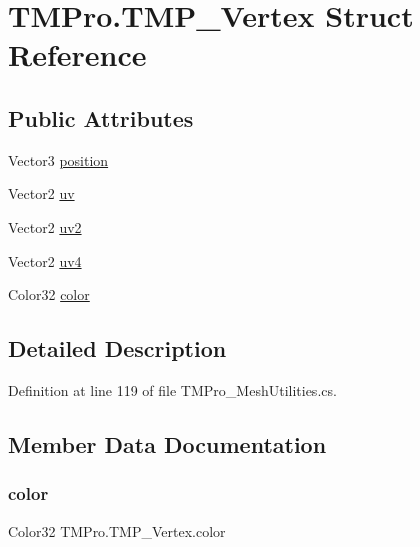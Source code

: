 \hypertarget{struct_t_m_pro_1_1_t_m_p___vertex}{}\section{T\+M\+Pro.\+T\+M\+P\+\_\+\+Vertex Struct Reference}
\label{struct_t_m_pro_1_1_t_m_p___vertex}
\subsection*{Public Attributes}
\begin{DoxyCompactItemize}
\item 
Vector3 \mbox{\hyperlink{struct_t_m_pro_1_1_t_m_p___vertex_a732a47e3a657ca52b92385e80b508884}{position}}
\item 
Vector2 \mbox{\hyperlink{struct_t_m_pro_1_1_t_m_p___vertex_a59196c5cd9804d336c9a2613fd6ab372}{uv}}
\item 
Vector2 \mbox{\hyperlink{struct_t_m_pro_1_1_t_m_p___vertex_ada62857008e1bad64543b8eae39569fc}{uv2}}
\item 
Vector2 \mbox{\hyperlink{struct_t_m_pro_1_1_t_m_p___vertex_a9176ef79e37d8e47e1df5b6cb525a969}{uv4}}
\item 
Color32 \mbox{\hyperlink{struct_t_m_pro_1_1_t_m_p___vertex_ab551ac743bc3755dcb3110e95d284d24}{color}}
\end{DoxyCompactItemize}


\subsection{Detailed Description}


Definition at line 119 of file T\+M\+Pro\+\_\+\+Mesh\+Utilities.\+cs.



\subsection{Member Data Documentation}
\mbox{\label{struct_t_m_pro_1_1_t_m_p___vertex_ab551ac743bc3755dcb3110e95d284d24}} 
\subsubsection{\texorpdfstring{color}{color}}
{\footnotesize\ttfamily Color32 T\+M\+Pro.\+T\+M\+P\+\_\+\+Vertex.\+color}



